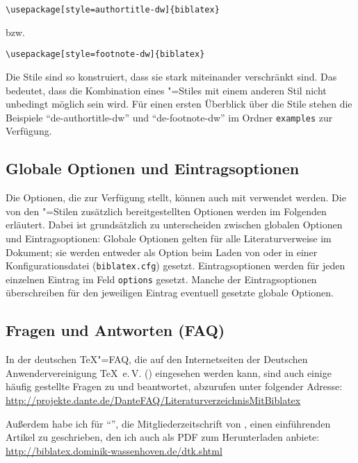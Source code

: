 \documentclass[ngerman]{scrartcl}
\begin{document}
\begin{lstlisting} 
\usepackage[style=authortitle-dw]{biblatex}
\end{lstlisting}
bzw.
\begin{lstlisting} 
\usepackage[style=footnote-dw]{biblatex}
\end{lstlisting}
Die Stile sind so konstruiert, dass sie stark miteinander verschränkt sind.
Das bedeutet, dass die Kombination eines \bldw"=Stiles mit einem anderen Stil
nicht unbedingt möglich sein wird.
Für einen ersten Überblick über die Stile stehen die Beispiele \enquote{de-authortitle-dw} 
und \enquote{de-footnote-dw} im Ordner \texttt{examples} zur Verfügung.

\subsection{Globale Optionen und Eintragsoptionen}
Die Optionen, die \bl{} zur Verfügung stellt, können auch mit \bldw{} verwendet
werden. Die von den \bldw"=Stilen zusätzlich bereitgestellten Optionen
werden im Folgenden erläutert. Dabei ist grundsätzlich zu unterscheiden
zwischen globalen Optionen und Eintragsoptionen: Globale Optionen gelten für alle
Literaturverweise im Dokument; sie werden entweder als Option beim Laden von \bl{}
oder in einer Konfigurationsdatei (\texttt{biblatex.cfg}) gesetzt. Eintragsoptionen
werden für jeden einzelnen Eintrag im Feld \texttt{options} gesetzt. Manche der
Eintragsoptionen überschreiben für den jeweiligen Eintrag eventuell gesetzte globale Optionen.

\subsection{Fragen und Antworten (FAQ)}
In der deutschen \TeX"=FAQ, die auf den Internetseiten der Deutschen Anwendervereinigung
\TeX\ e.\,V. (\DANTE) eingesehen werden kann, sind auch einige häufig gestellte Fragen 
zu \bl{} und \bldw{} beantwortet, abzurufen unter folgender Adresse:\\
\href{http://projekte.dante.de/DanteFAQ/LiteraturverzeichnisMitBiblatex}%
     {http://projekte.dante.de/DanteFAQ/LiteraturverzeichnisMitBiblatex}

Außerdem habe ich für \enquote{\DTK}, die Mitgliederzeitschrift
von \DANTE, einen einführenden Artikel zu \bl{} geschrieben, den ich auch als PDF
zum Herunterladen anbiete:\\
\href{http://biblatex.dominik-wassenhoven.de/dtk.shtml}%
     {http://biblatex.dominik-wassenhoven.de/dtk.shtml}
\end{document}
